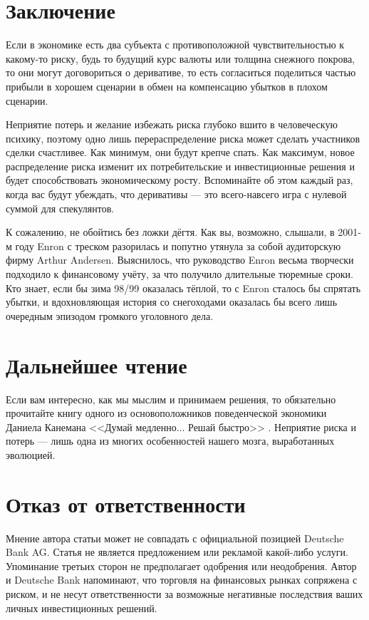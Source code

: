 \section*{Заключение}

Если в экономике есть два субъекта с противоположной чувствительностью
к какому-то риску, будь то будущий курс валюты или толщина снежного покрова, то они
могут договориться о деривативе, то есть согласиться поделиться частью прибыли
в хорошем сценарии в обмен на компенсацию убытков в плохом сценарии.

Неприятие потерь и желание избежать риска глубоко вшито в человеческую
психику, поэтому одно лишь перераспределение риска может сделать участников сделки
счастливее. Как минимум, они будут крепче спать. Как максимум, новое распределение
риска изменит их потребительские и инвестиционные решения и будет способствовать
экономическому росту. Вспоминайте об этом каждый раз, когда вас будут убеждать, что
деривативы --- это всего-навсего игра с нулевой суммой для спекулянтов.

К сожалению, не обойтись без ложки дёгтя. Как вы, возможно, слышали, в 2001-м году
Enron с треском разорилась и попутно утянула за собой аудиторскую фирму Arthur
Andersen. Выяснилось, что руководство Enron весьма творчески подходило к
финансовому учёту, за что получило длительные тюремные сроки. Кто знает, если бы
зима 98/99 оказалась тёплой, то с Enron сталось бы спрятать убытки, и вдохновляющая
история со снегоходами оказалась бы всего лишь очередным эпизодом громкого уголовного дела.

\section*{Дальнейшее чтение}

Если вам интересно, как мы мыслим и принимаем решения, то обязательно прочитайте
книгу одного из основоположников поведенческой экономики Даниела Канемана 
<<Думай медленно... Решай быстро>> \cite{kanheman2013think}. Неприятие риска и
потерь --- лишь одна из многих особенностей нашего мозга, выработанных эволюцией.

\section*{Отказ от ответственности}

Мнение автора статьи может не совпадать с официальной позицией Deutsche Bank AG.
Статья не является предложением или рекламой какой-либо услуги. Упоминание
третьих сторон не предполагает одобрения или неодобрения. Автор и Deutsche Bank
напоминают, что торговля на финансовых рынках сопряжена с риском, и не несут
ответственности за возможные негативные последствия ваших личных инвестиционных
решений.

\begin{otherlanguage}{english}
\printbibliography[title = \begin{otherlanguage}{russian}Список
литературы\end{otherlanguage}]
\end{otherlanguage}

\printendnotes


